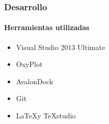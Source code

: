 \begin{frame}
	\frametitle{Desarrollo}
	\framesubtitle{Herramientas utilizadas}
	
	\begin{itemize}
		\item Visual Studio 2013 Ultimate
		\item OxyPlot
		\item AvalonDock
		\item Git
		\item \LaTeX y TeXstudio
	\end{itemize}
\end{frame}